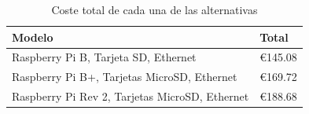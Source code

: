 \begin{table}[H]
\centering
\begin{tabular}{|l|l|}\hline
\textbf{Modelo}&\textbf{Total}\\
\hline
Raspberry Pi B, Tarjeta SD, Ethernet&€145.08\\
\hline
Raspberry Pi B+, Tarjetas MicroSD, Ethernet&€169.72\\
\hline
Raspberry Pi Rev 2, Tarjetas MicroSD, Ethernet&€188.68\\
\hline
\end{tabular}
\caption{Coste total de cada una de las alternativas}
\end{table}


